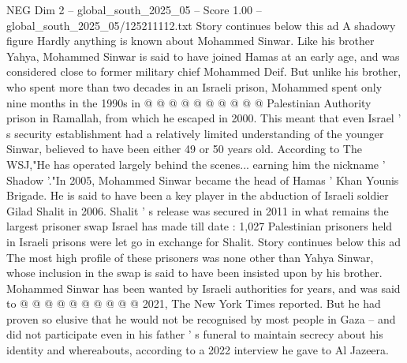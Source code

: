 \begin{textsample}{NEG Dim 2 – global\_south\_2025\_05 – Score 1.00 – global\_south\_2025\_05/125211112.txt}
Story continues below this ad A shadowy figure Hardly anything is known about Mohammed Sinwar.
Like his brother Yahya, Mohammed Sinwar is said to have joined Hamas at an early age, and was considered close to former military chief Mohammed Deif.
But unlike his brother, who spent more than two decades in an Israeli prison, Mohammed spent only nine months in the 1990s in @ @ @ @ @ @ @ @ @ @ Palestinian Authority prison in Ramallah, from which he escaped in 2000.
This meant that even Israel ' s security establishment had a relatively limited understanding of the younger Sinwar, believed to have been either 49 or 50 years old.
According to The WSJ,"He has operated largely behind the scenes... earning him the nickname ' Shadow '."In 2005, Mohammed Sinwar became the head of Hamas ' Khan Younis Brigade.
He is said to have been a key player in the abduction of Israeli soldier Gilad Shalit in 2006.
Shalit ' s release was secured in 2011 in what remains the largest prisoner swap Israel has made till date : 1,027 Palestinian prisoners held in Israeli prisons were let go in exchange for Shalit.
Story continues below this ad The most high profile of these prisoners was none other than Yahya Sinwar, whose inclusion in the swap is said to have been insisted upon by his brother.
Mohammed Sinwar has been wanted by Israeli authorities for years, and was said to @ @ @ @ @ @ @ @ @ @ 2021, The New York Times reported.
But he had proven so elusive that he would not be recognised by most people in Gaza -- and did not participate even in his father ' s funeral to maintain secrecy about his identity and whereabouts, according to a 2022 interview he gave to Al Jazeera.

\end{textsample}

